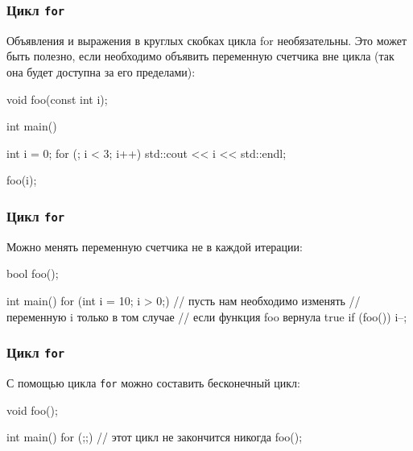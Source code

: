 \documentclass[compress, 8pt]{beamer}
\begin{document}
\begin{frame}[fragile]

    \frametitle{Цикл \texttt{for}}

    Объявления и выражения в круглых скобках цикла for необязательны.
    Это может быть полезно, если необходимо объявить переменную счетчика
    вне цикла (так она будет доступна за его пределами):

    \begin{myinplacelisting}[minted language=cpp]
void foo(const int i);

int main() {
    int i = 0;
    for (; i < 3; i++) {
        std::cout << i << std::endl;
    }

    foo(i);
}
    \end{myinplacelisting}

\end{frame}

\begin{frame}[fragile]

    \frametitle{Цикл \texttt{for}}

    Можно менять переменную счетчика не в каждой итерации:

    \begin{myinplacelisting}[minted language=cpp]
bool foo();

int main() {
    for (int i = 10; i > 0;) {
        // пусть нам необходимо изменять
        // переменную i только в том случае
        // если функция foo вернула true
        if (foo()) {
            i--;
        }
    }
}
    \end{myinplacelisting}

\end{frame}

\begin{frame}[fragile]

    \frametitle{Цикл \texttt{for}}

    С помощью цикла \verb|for| можно составить бесконечный
    цикл\footnotemark{}:


    \begin{myinplacelisting}[minted language=cpp]
void foo();

int main() {
    for (;;) {
        // этот цикл не закончится никогда
        foo();
    }
}
    \end{myinplacelisting}

\end{frame}
\end{document}
